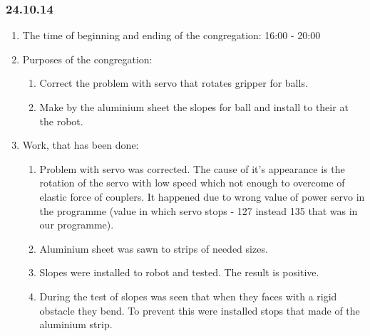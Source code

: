
\subsubsection{24.10.14}

\begin{enumerate}
	\item The time of beginning and ending of the congregation:
	16:00 - 20:00
	\item Purposes of the congregation:
	\begin{enumerate}
	  \item Correct the problem with servo that rotates gripper for balls.
	  
	  \item Make by the aluminium sheet the slopes for ball and install to their at the robot.
	  
    \end{enumerate}
    
	\item Work, that has been done:
	\begin{enumerate}
	  \item Problem with servo was corrected. The cause of it's appearance is the rotation of the servo with low speed which not enough to overcome of elastic force of couplers. It happened due to wrong value of power servo in the programme (value in which servo stops - 127 instead 135 that was in our programme).
      
      \item Aluminium sheet was sawn to strips of needed sizes.
      
      \item Slopes were installed to robot and tested. The result is positive.
      
      \item During the test of slopes was seen that when they faces with a rigid obstacle they bend. To prevent this were installed stops that made of the aluminium strip.
      

\end{enumerate}
\end{enumerate}
